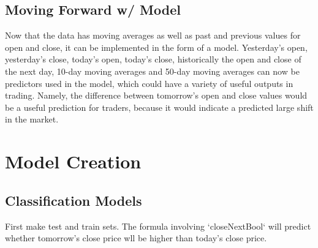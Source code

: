 \documentclass{article}\usepackage[]{graphicx}\usepackage[]{color}
\begin{document}
\begin{figure}[ht]
\begin{center}
\qquad
{}
\end{center}
\end{figure}







\subsection{Moving Forward w/ Model}
Now that the data has moving averages as well as past and previous values for open and close, it can be implemented in the form of a model. 
Yesterday's open, yesterday's close, today's open, today's close, historically the open and close of the next day, 10-day moving averages and 50-day moving averages can now be predictors used in the model, which could have a variety of useful outputs in trading. Namely, the difference between tomorrow's open and close values would be a useful prediction for traders, because it would indicate a predicted large shift in the market.

\section{Model Creation}
\subsection{Classification Models}
First make test and train sets.
The formula involving `closeNextBool` will predict whether tomorrow's close price wll be higher than today's close price.
\end{document}
